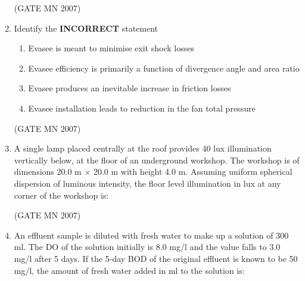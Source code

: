 \documentclass[journal]{IEEEtran}
\begin{document}
\begin{enumerate}
\hfill (GATE MN 2007)

\item Identify the \textbf{INCORRECT} statement

\begin{enumerate}
\item Evasee is meant to minimise exit shock losses
\item Evasee efficiency is primarily a function of divergence angle and area ratio
\item Evasee produces an inevitable increase in friction losses
\item Evasee installation leads to reduction in the fan total pressure
\end{enumerate}

\hfill (GATE MN 2007)

\item A single lamp placed centrally at the roof provides 40 lux illumination vertically below, at the floor of an underground workshop. The workshop is of dimensions 20.0 m $\times$ 20.0 m with height 4.0 m. Assuming uniform spherical dispersion of luminous intensity, the floor level illumination in lux at any corner of the workshop is:

\begin{enumerate}
\end{enumerate}

\hfill (GATE MN 2007)

\item An effluent sample is diluted with fresh water to make up a solution of 300 ml. The DO of the solution initially is 8.0 mg/l and the value falls to 3.0 mg/l after 5 days. If the 5-day BOD of the original effluent is known to be 50 mg/l, the amount of fresh water added in ml to the solution is:

\begin{enumerate}
\end{enumerate}


\end{enumerate}
\end{document}
